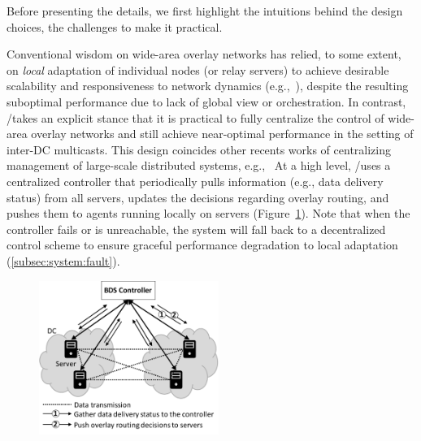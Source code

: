  Before presenting the details, we first highlight the intuitions behind the design choices, the challenges to make it practical.


Conventional wisdom on wide-area overlay networks has relied, to
some extent, on {\em local} adaptation of individual nodes (or
relay servers) to achieve desirable scalability and responsiveness
to network dynamics
(e.g.,~\cite{Andreev2013Designing,Repantis2010Scaling,Huang2014A,mukerjee2014enabling}),
despite the resulting suboptimal performance due to lack of global
view or orchestration.
In contrast, \name/\newname takes an explicit stance that it is practical to
fully centralize the control of wide-area overlay networks and
still achieve near-optimal performance in the setting of inter-DC
multicasts. This design coincides other recents works of centralizing
management of large-scale distributed systems, e.g.,~\cite{gog2016firmament}
At a high level, \name/\newname uses a centralized controller that
periodically pulls information (e.g., data delivery status) from all
servers, updates the decisions regarding overlay routing, and pushes
them to agents running locally on servers
(Figure~\ref{fig:framework}).
Note that when the controller fails or is unreachable, the system will
fall back to a decentralized control scheme to ensure graceful
performance degradation to local adaptation
(\Section\ref{subsec:system:fault}).

\begin{figure}[t]
  \centering
  \includegraphics[width=2.3in]{images/framework-new.pdf}
    \vspace{-0.2cm}
  \label{fig:framework}
\vspace{-0.4cm}
\end{figure}

